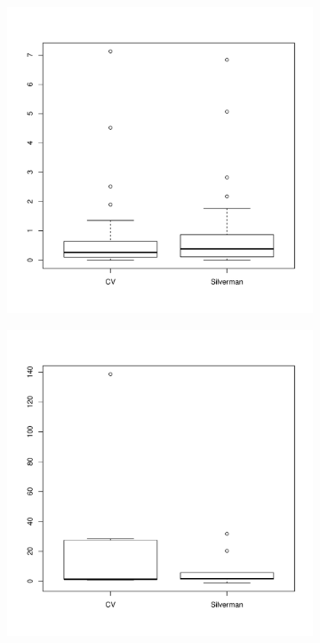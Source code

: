 \begin{figure}[htbp]
    \centering
    \begin{subfigure}[t]{0.45\textwidth}
        \includegraphics[width=\textwidth]{results/by_overall/normalized-mise-diff-boxplot}
        \label{fig:discussion:overall_nmise_diff_boxplot:unif}
    \end{subfigure}
    \begin{subfigure}[t]{0.45\textwidth}
        \includegraphics[width=\textwidth]{results/by_overall/normalized-mise-diff-peakpop-boxplot}

\end{subfigure}
\end{figure}
